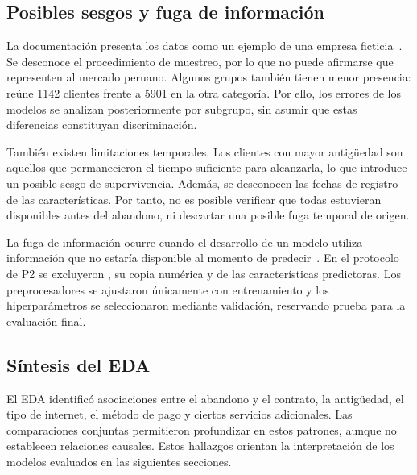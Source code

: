 
\subsection{Posibles sesgos y fuga de información}

La documentación presenta los datos como un ejemplo de una empresa ficticia~\cite{ibm}. Se desconoce el procedimiento de
muestreo, por lo que no puede afirmarse que representen al mercado peruano. Algunos grupos también tienen menor
presencia:  reúne 1142 clientes frente a 5901 en la otra categoría. Por ello, los errores de los
modelos se analizan posteriormente por subgrupo, sin asumir que estas diferencias constituyan discriminación.

También existen limitaciones temporales. Los clientes con mayor antigüedad son aquellos que permanecieron el tiempo
suficiente para alcanzarla, lo que introduce un posible sesgo de supervivencia. Además, se desconocen las fechas de
registro de las características. Por tanto, no es posible verificar que todas estuvieran disponibles antes del
abandono, ni descartar una posible fuga temporal de origen.

La fuga de información ocurre cuando el desarrollo de un modelo utiliza información que no estaría disponible al
momento de predecir~\cite{leakage}. En el protocolo de P2 se excluyeron , su copia numérica
 y  de las características predictoras. Los preprocesadores se ajustaron únicamente
con entrenamiento y los hiperparámetros se seleccionaron mediante validación, reservando prueba para la evaluación final.

\subsection{Síntesis del EDA}

El EDA identificó asociaciones entre el abandono y el contrato, la antigüedad, el tipo de internet,
el método de pago y ciertos servicios adicionales. Las comparaciones conjuntas permitieron profundizar
en estos patrones, aunque no establecen relaciones causales. Estos hallazgos orientan la interpretación
de los modelos evaluados en las siguientes secciones.


